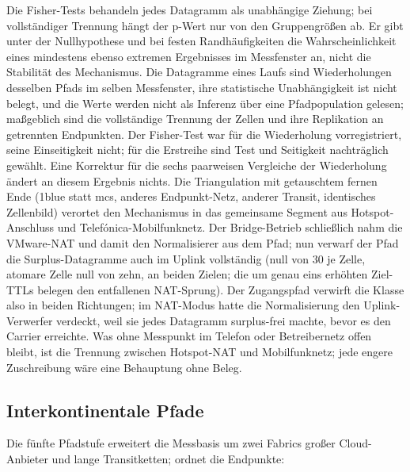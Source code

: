 Die Fisher-Tests behandeln jedes Datagramm als unabhängige Ziehung; bei
vollständiger Trennung hängt der p-Wert nur von den Gruppengrößen ab. Er gibt unter der Nullhypothese und
bei festen Randhäufigkeiten die Wahrscheinlichkeit eines mindestens ebenso extremen Ergebnisses im
Messfenster an, nicht die Stabilität des Mechanismus. Die Datagramme eines Laufs sind Wiederholungen
desselben Pfads im selben Messfenster, ihre statistische Unabhängigkeit ist nicht belegt, und die Werte
werden nicht als Inferenz über eine Pfadpopulation gelesen; maßgeblich sind die vollständige Trennung der
Zellen und ihre Replikation an getrennten Endpunkten. Der Fisher-Test war für die Wiederholung
vorregistriert, seine Einseitigkeit nicht; für die Erstreihe sind Test und Seitigkeit nachträglich gewählt.
Eine Korrektur für die sechs paarweisen Vergleiche der Wiederholung ändert an diesem Ergebnis nichts.
Die Triangulation mit getauschtem fernen Ende (1blue statt mcs, anderes Endpunkt-Netz,
anderer Transit, identisches Zellenbild) verortet den Mechanismus in das gemeinsame Segment aus
Hotspot-Anschluss und Telefónica-Mobilfunknetz. Der Bridge-Betrieb schließlich nahm die VMware-NAT und
damit den Normalisierer aus dem Pfad; nun verwarf der Pfad die Surplus-Datagramme auch
im Uplink vollständig (null von 30 je Zelle, atomare Zelle null von zehn, an beiden Zielen; die um genau
eins erhöhten Ziel-TTLs belegen den entfallenen NAT-Sprung). Der Zugangspfad verwirft die Klasse also in
beiden Richtungen; im NAT-Modus hatte die Normalisierung den Uplink-Verwerfer verdeckt, weil sie jedes
Datagramm surplus-frei machte, bevor es den Carrier erreichte. Was ohne Messpunkt im Telefon oder
Betreibernetz offen bleibt,
ist die Trennung zwischen Hotspot-NAT und Mobilfunknetz; jede engere Zuschreibung wäre eine Behauptung
ohne Beleg.

\subsection{Interkontinentale Pfade}
\label{subsec:eval-interkontinental}

Die fünfte Pfadstufe erweitert die Messbasis um zwei Fabrics großer Cloud-Anbieter und lange Transitketten;
 ordnet die Endpunkte:

